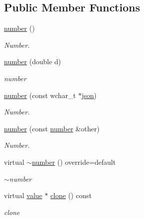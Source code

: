 \subsection*{Public Member Functions}
\begin{DoxyCompactItemize}
\item 
\hyperlink{classformat_1_1number_a58066aeca6b6d93482c0f90038fa3b32}{number} ()\hypertarget{classformat_1_1number_a58066aeca6b6d93482c0f90038fa3b32}{}\label{classformat_1_1number_a58066aeca6b6d93482c0f90038fa3b32}

\begin{DoxyCompactList}\small\item\em Number. \end{DoxyCompactList}\item 
\hyperlink{classformat_1_1number_acea9b475fe9ad85524c63871b9883fa0}{number} (double d)
\begin{DoxyCompactList}\small\item\em number \end{DoxyCompactList}\item 
\hyperlink{classformat_1_1number_a8b5dc6dac86b17a82614ffa9f7aa4791}{number} (const wchar\+\_\+t $\ast$\hyperlink{classformat_1_1json}{json})
\begin{DoxyCompactList}\small\item\em Number. \end{DoxyCompactList}\item 
\hyperlink{classformat_1_1number_a564ebd8714e06cec52daa5c62dbb37b1}{number} (const \hyperlink{classformat_1_1number}{number} \&other)
\begin{DoxyCompactList}\small\item\em Number. \end{DoxyCompactList}\item 
virtual \hyperlink{classformat_1_1number_ab9112b9c312f94488ba48187779787c9}{$\sim$number} () override=default
\begin{DoxyCompactList}\small\item\em $\sim$number \end{DoxyCompactList}\item 
virtual \hyperlink{classformat_1_1value_aa6b85823936bf7b8ab78d3f8d443c00d}{value} $\ast$ \hyperlink{classformat_1_1number_aa4c1aec4e42a504ea16f6b09c2223d9e}{clone} () const 
\begin{DoxyCompactList}\small\item\em clone \end{DoxyCompactList}\item 

\end{DoxyCompactItemize}
